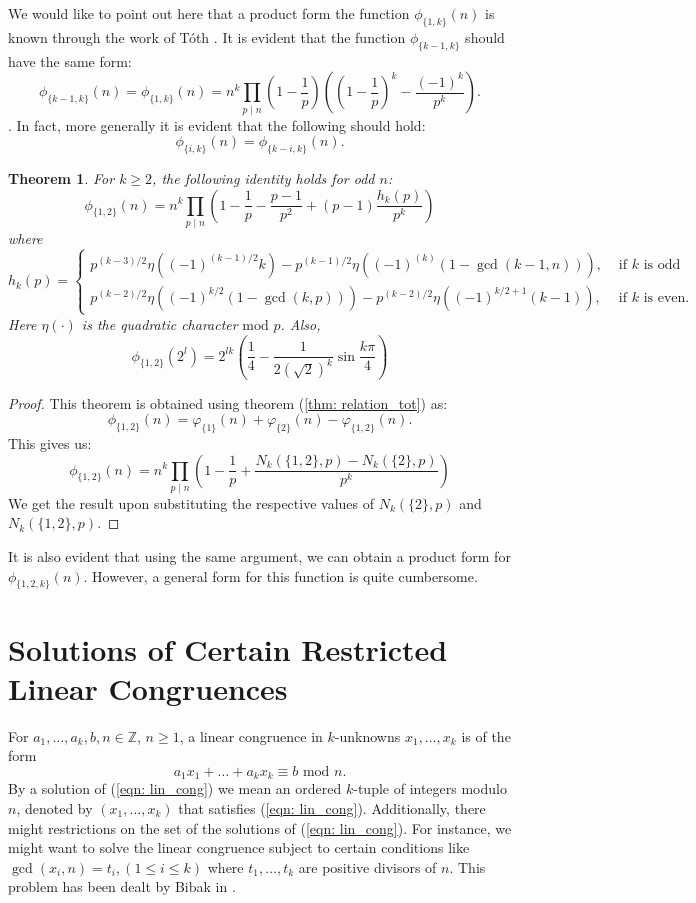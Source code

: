 \documentclass[12pt]{article}
\newtheorem{thm}{Theorem}[subsection]%
\begin{document}
    We would like to point out here that a product form the function $\phi_{\{1,k\}}(n)$ is known through the work of T\'{o}th \cite{toth2022another}. It is evident that the function $\phi_{\{k-1,k\}}$ should have the same form:
    \[
    \phi_{\{k-1,k\}}(n)=\phi_{\{1,k\}}(n)=n^k\prod_{p\mid n}\left(1-\frac{1}{p}\right)\left(\left(1-\frac{1}{p}\right)^k - \frac{(-1)^k}{p^k}\right).
    \].
    In fact, more generally it is evident that the following should hold:\[
    \phi_{\{i,k\}}(n)=\phi_{\{k-i,k\}}(n).
    \]
\begin{thm}\label{thm: tot_func2{1,2}}
    For $k\geq 2$, the following identity holds for odd $n$:\[
    \phi_{\{1,2\}}(n)=n^k\prod_{p\mid n}\left(1-\frac{1}{p}-\frac{p-1}{p^2}+(p-1)\frac{h_k(p)}{p^k}\right)
    \]
    where\[
    h_k(p)=\begin{cases}
        p^{(k-3)/2}\eta((-1)^{(k-1)/2}k)-p^{(k-1)/2}\eta((-1)^{(k)}(1-\gcd(k-1, n))), &\text{ if }k\text{ is odd}\\
        p^{(k-2)/2}\eta((-1)^{k/2}(1-\gcd(k,p)))-
         p^{(k-2)/2}\eta((-1)^{k/2+1}(k-1)), &\text{ if }k\text{ is even}.
    \end{cases}
    \]
    Here $\eta(\cdot)$ is the quadratic character$\text{ mod } p$.
     Also,
    \[
    \phi_{\{1,2\}}(2^l)=2^{lk}\left(\frac{1}{4}-\frac{1}{2\left(\sqrt{2}\right)^k}\sin\frac{k\pi}{4}\right)
    \]
\end{thm}
\begin{proof}
    This theorem is obtained using theorem (\ref{thm: relation_tot}) as:
    \[
    \phi_{\{1,2\}}(n)=\varphi_{\{1\}}(n)+\varphi_{\{2\}}(n)-\varphi_{\{1,2\}}(n).
    \]
    This gives us:
    \[
    \phi_{\{1,2\}}(n)=n^k\prod_{p\mid n}\left(1-\frac{1}{p}+\frac{N_k(\{1,2\},p)-N_k(\{2\},p)}{p^k}\right)
    \]
    We get the result upon substituting the respective values of $N_k(\{2\},p)$ and $N_k(\{1,2\},p)$.
\end{proof}
It is also evident that using the same argument, we can obtain a product form for $\phi_{\{1,2,k\}}(n)$. However, a general form for this function is quite cumbersome.


\section{Solutions of Certain Restricted Linear Congruences}
For $a_1,\dots, a_k, b, n\in \mathbb{Z}$, $n\geq 1$, a linear congruence in $k$-unknowns $x_1,\dots, x_k$ is of the form 
\begin{equation}\label{eqn: lin_cong}
    a_1x_1+\dots+a_kx_k\equiv b\text{ mod }n.
\end{equation}
By a solution of (\ref{eqn: lin_cong}) we mean an ordered $k$-tuple of integers modulo $n$, denoted by $(x_1,\dots, x_k)$ that satisfies (\ref{eqn: lin_cong}). Additionally, there might restrictions on the set of the solutions of (\ref{eqn: lin_cong}). For instance, we might want to solve the linear congruence subject to certain conditions like $\gcd(x_i,n)=t_i, (1\leq i\leq k)$ where $t_1,\dots, t_k$ are positive divisors of $n$. This problem has been dealt by Bibak in \cite{bibak2017restricted}.
\end{document}
